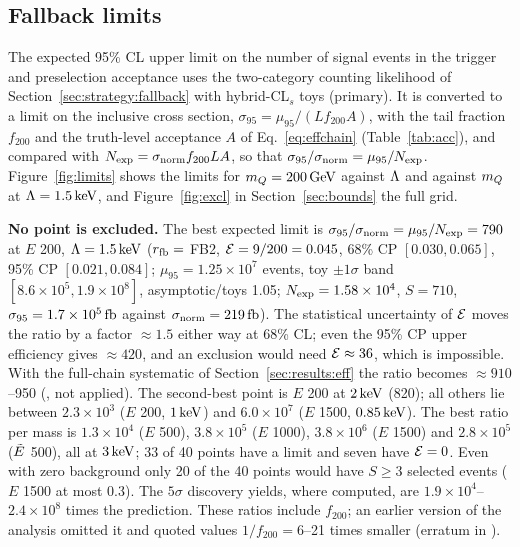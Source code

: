 \subsection{Fallback limits}\label{sec:results:limits}
The expected 95\% CL upper limit on the number of signal events in the trigger and preselection acceptance uses the
two-category counting likelihood of Section~\ref{sec:strategy:fallback} with hybrid-CL$_s$ toys (primary). It is
converted to a limit on the inclusive cross section, $\sigma_{95}=\mu_{95}/(Lf_{200}A)$, with the tail fraction $f_{200}$
and the truth-level acceptance $A$ of Eq.~\eqref{eq:effchain} (Table~\ref{tab:acc}), and compared with
$N_{\rm exp}=\sigma_{\rm norm}f_{200}LA$, so that $\sigma_{95}/\sigma_{\rm norm}=\mu_{95}/N_{\rm exp}$.
Figure~\ref{fig:limits} shows the limits for $m_Q=200\,\mathrm{GeV}$ against $\Lambda$ and against $m_Q$ at $\Lambda=1.5\,\mathrm{keV}$, and
Figure~\ref{fig:excl} in Section~\ref{sec:bounds} the full grid.

\textbf{No point is excluded.} The best expected limit is $\sigma_{95}/\sigma_{\rm norm}=\mu_{95}/N_{\rm exp}=790$ at $E$
200, $\Lambda=1.5\,\mathrm{keV}$ ($r_{\rm fb}=$ FB2, $\mathcal{E}=9/200=0.045$, 68\% CP $[0.030,0.065]$, 95\% CP $[0.021,0.084]$; $\mu_{95}=1.25\times
10^7$ events, toy $\pm1\sigma$ band $[8.6\times10^5,1.9\times10^8]$, asymptotic/toys 1.05; $N_{\rm exp}=1.58\times10^4$,
$S=710$, $\sigma_{95}=1.7\times10^5\,\mathrm{fb}$ against $\sigma_{\rm norm}=219\,\mathrm{fb}$). The statistical uncertainty of $\mathcal{E}$ moves the
ratio by a factor $\approx1.5$ either way at 68\% CL; even the 95\% CP upper efficiency gives $\approx420$, and an
exclusion would need $\mathcal{E}\approx36$, which is impossible. With the full-chain systematic of Section~\ref{sec:results:eff}
the ratio becomes $\approx910$--950 (\EST{}, not applied). The second-best point is $E$ 200 at $2\,\mathrm{keV}$ (820); all others lie
between $2.3\times10^3$ ($E$ 200, $1\,\mathrm{keV}$) and $6.0\times10^7$ ($E$ 1500, $0.85\,\mathrm{keV}$). The best ratio per mass is
$1.3\times10^4$ ($E$ 500), $3.8\times10^5$ ($E$ 1000), $3.8\times10^6$ ($E$ 1500) and $2.8\times10^5$ ($\tilde{E}$ 500), all at
$3\,\mathrm{keV}$; 33 of 40 points have a limit and seven have $\mathcal{E}=0$. Even with zero background only 20 of the 40 points would
have $S\ge3$ selected events ($E$ 1500 at most 0.3). The $5\sigma$ discovery yields, where computed, are
$1.9\times10^4$--$2.4\times10^8$ times the prediction. These ratios include $f_{200}$; an earlier version of the
analysis omitted it and quoted values $1/f_{200}=6$--21 times smaller (erratum in ).

